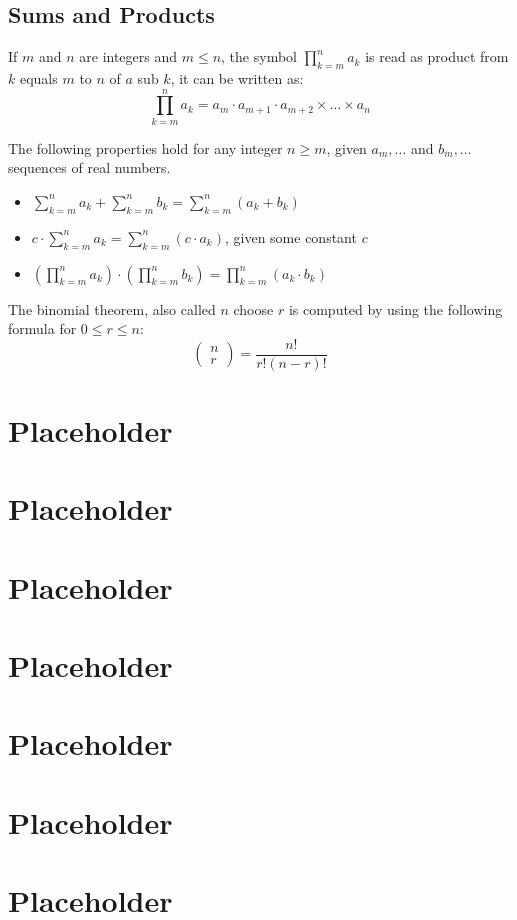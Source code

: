 \documentclass[a4paper]{article}
\begin{document}
    \subsection{Sums and Products}
    If $m$ and $n$ are integers and $m \le n$, the symbol $\prod_{k=m}^n a_k$ is read as product from $k$ equals $m$ to $n$ of $a$ sub $k$, it can be written as:
    $$
    \prod_{k=m}^n a_k = a_m \cdot a_{m+1} \cdot a_{m+2} \times \dots \times a_n
    $$
    \begin{theorem}
      The following properties hold for any integer $n \geq m$, given $a_m, \dots$ and $b_m,\dots$ sequences of real numbers.
      \begin{itemize}
        \item $\sum_{k=m }^{n} a_k + \sum_{k=m }^{n} b_k = \sum_{k=m }^{n} (a_k + b_k)$
        \item $c\cdot \sum_{k=m }^{n} a_k = \sum_{k=m }^{n} (c\cdot a_k)$, given some constant $c$
        \item $(\prod_{k=m}^{n}a_k) \cdot (\prod_{k=m}^{n}b_k) = \prod_{k=m}^{n} (a_k \cdot b_k)$
      \end{itemize}
    \end{theorem}
    \begin{theorem}
      The binomial theorem, also called $n$ choose $r$ is computed by using the following formula for $0 \le r \le n$:
      \begin{displaymath}
       \begin{pmatrix}
        n \\ r
       \end{pmatrix} 
       = \displaystyle\frac{n! }{r!(n-r)!}
      \end{displaymath}
    \end{theorem}
    
    
  \section{Placeholder} 
  \section{Placeholder} 
  \section{Placeholder} 
  \section{Placeholder} 
  \section{Placeholder} 
  \section{Placeholder} 
  \section{Placeholder} 
\end{document}
